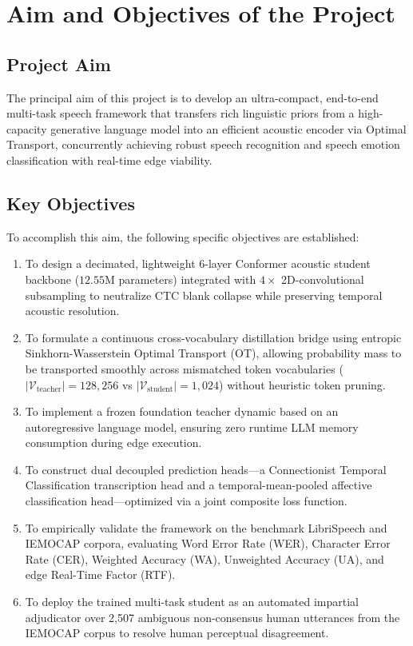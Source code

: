 \section{Aim and Objectives of the Project}

\subsection{Project Aim}
The principal aim of this project is to develop an ultra-compact, end-to-end multi-task speech framework that transfers rich linguistic priors from a high-capacity generative language model into an efficient acoustic encoder via Optimal Transport, concurrently achieving robust speech recognition and speech emotion classification with real-time edge viability.

\subsection{Key Objectives}
To accomplish this aim, the following specific objectives are established:
\begin{enumerate}
    \item To design a decimated, lightweight 6-layer Conformer acoustic student backbone ($12.55\text{M}$ parameters) integrated with $4\times$ 2D-convolutional subsampling to neutralize CTC blank collapse while preserving temporal acoustic resolution.
    \item To formulate a continuous cross-vocabulary distillation bridge using entropic Sinkhorn-Wasserstein Optimal Transport (OT), allowing probability mass to be transported smoothly across mismatched token vocabularies ($|\mathcal{V}_{\text{teacher}}| = 128{,}256$ vs $|\mathcal{V}_{\text{student}}| = 1{,}024$) without heuristic token pruning.
    \item To implement a frozen foundation teacher dynamic based on an autoregressive language model, ensuring zero runtime LLM memory consumption during edge execution.
    \item To construct dual decoupled prediction heads—a Connectionist Temporal Classification transcription head and a temporal-mean-pooled affective classification head—optimized via a joint composite loss function.
    \item To empirically validate the framework on the benchmark LibriSpeech and IEMOCAP corpora, evaluating Word Error Rate (WER), Character Error Rate (CER), Weighted Accuracy (WA), Unweighted Accuracy (UA), and edge Real-Time Factor (RTF).
    \item To deploy the trained multi-task student as an automated impartial adjudicator over 2,507 ambiguous non-consensus human utterances from the IEMOCAP corpus to resolve human perceptual disagreement.
\end{enumerate}

